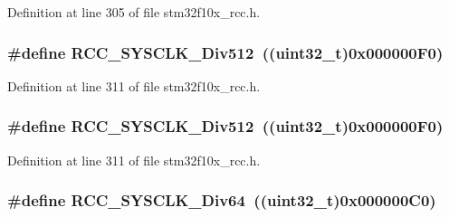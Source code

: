 Definition at line 305 of file stm32f10x\+\_\+rcc.\+h.

\subsubsection[{\texorpdfstring{R\+C\+C\+\_\+\+S\+Y\+S\+C\+L\+K\+\_\+\+Div512}{RCC_SYSCLK_Div512}}]{\setlength{\rightskip}{0pt plus 5cm}\#define R\+C\+C\+\_\+\+S\+Y\+S\+C\+L\+K\+\_\+\+Div512~(({\bf uint32\+\_\+t})0x000000\+F0)}\hypertarget{group___a_h_b__clock__source_gab5b4588c455d6327bc96f131ed6698ab}{}\label{group___a_h_b__clock__source_gab5b4588c455d6327bc96f131ed6698ab}


Definition at line 311 of file stm32f10x\+\_\+rcc.\+h.

\subsubsection[{\texorpdfstring{R\+C\+C\+\_\+\+S\+Y\+S\+C\+L\+K\+\_\+\+Div512}{RCC_SYSCLK_Div512}}]{\setlength{\rightskip}{0pt plus 5cm}\#define R\+C\+C\+\_\+\+S\+Y\+S\+C\+L\+K\+\_\+\+Div512~(({\bf uint32\+\_\+t})0x000000\+F0)}\hypertarget{group___a_h_b__clock__source_gab5b4588c455d6327bc96f131ed6698ab}{}\label{group___a_h_b__clock__source_gab5b4588c455d6327bc96f131ed6698ab}


Definition at line 311 of file stm32f10x\+\_\+rcc.\+h.

\subsubsection[{\texorpdfstring{R\+C\+C\+\_\+\+S\+Y\+S\+C\+L\+K\+\_\+\+Div64}{RCC_SYSCLK_Div64}}]{\setlength{\rightskip}{0pt plus 5cm}\#define R\+C\+C\+\_\+\+S\+Y\+S\+C\+L\+K\+\_\+\+Div64~(({\bf uint32\+\_\+t})0x000000\+C0)}\hypertarget{group___a_h_b__clock__source_gab6a2c2d4e945c607259988a9b6df26e5}{}\label{group___a_h_b__clock__source_gab6a2c2d4e945c607259988a9b6df26e5}


